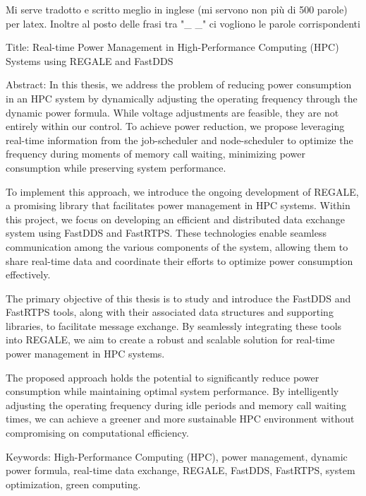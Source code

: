 Mi serve tradotto e scritto meglio in inglese (mi servono non più di 500 parole) per latex. Inoltre al posto delle frasi tra "_ _" ci vogliono le parole corrispondenti


Title: Real-time Power Management in High-Performance Computing (HPC) Systems using REGALE and FastDDS

Abstract:
In this thesis, we address the problem of reducing power consumption in an HPC system by dynamically adjusting the operating frequency through the dynamic power formula. While voltage adjustments are feasible, they are not entirely within our control. To achieve power reduction, we propose leveraging real-time information from the job-scheduler and node-scheduler to optimize the frequency during moments of memory call waiting, minimizing power consumption while preserving system performance.

To implement this approach, we introduce the ongoing development of REGALE, a promising library that facilitates power management in HPC systems. Within this project, we focus on developing an efficient and distributed data exchange system using FastDDS and FastRTPS. These technologies enable seamless communication among the various components of the system, allowing them to share real-time data and coordinate their efforts to optimize power consumption effectively.

The primary objective of this thesis is to study and introduce the FastDDS and FastRTPS tools, along with their associated data structures and supporting libraries, to facilitate message exchange. By seamlessly integrating these tools into REGALE, we aim to create a robust and scalable solution for real-time power management in HPC systems.

The proposed approach holds the potential to significantly reduce power consumption while maintaining optimal system performance. By intelligently adjusting the operating frequency during idle periods and memory call waiting times, we can achieve a greener and more sustainable HPC environment without compromising on computational efficiency.

Keywords: High-Performance Computing (HPC), power management, dynamic power formula, real-time data exchange, REGALE, FastDDS, FastRTPS, system optimization, green computing.
